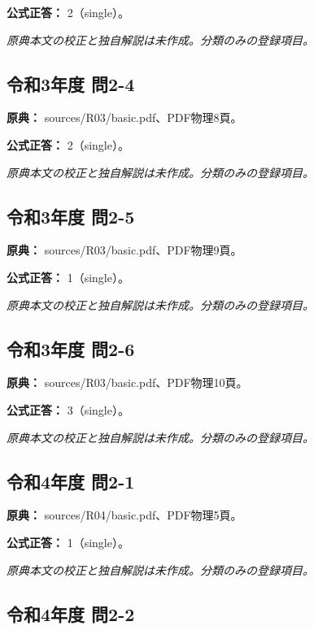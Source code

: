 \textbf{公式正答：} 2（single）。

\par\textit{原典本文の校正と独自解説は未作成。分類のみの登録項目。}

\subsection{令和3年度 問2-4}
\label{q:r03-reg-basic-2-4}

\noindent\textbf{原典：} sources/R03/basic.pdf、PDF物理8頁。

\textbf{公式正答：} 2（single）。

\par\textit{原典本文の校正と独自解説は未作成。分類のみの登録項目。}

\subsection{令和3年度 問2-5}
\label{q:r03-reg-basic-2-5}

\noindent\textbf{原典：} sources/R03/basic.pdf、PDF物理9頁。

\textbf{公式正答：} 1（single）。

\par\textit{原典本文の校正と独自解説は未作成。分類のみの登録項目。}

\subsection{令和3年度 問2-6}
\label{q:r03-reg-basic-2-6}

\noindent\textbf{原典：} sources/R03/basic.pdf、PDF物理10頁。

\textbf{公式正答：} 3（single）。

\par\textit{原典本文の校正と独自解説は未作成。分類のみの登録項目。}

\subsection{令和4年度 問2-1}
\label{q:r04-reg-basic-2-1}

\noindent\textbf{原典：} sources/R04/basic.pdf、PDF物理5頁。

\textbf{公式正答：} 1（single）。

\par\textit{原典本文の校正と独自解説は未作成。分類のみの登録項目。}

\subsection{令和4年度 問2-2}
\label{q:r04-reg-basic-2-2}

